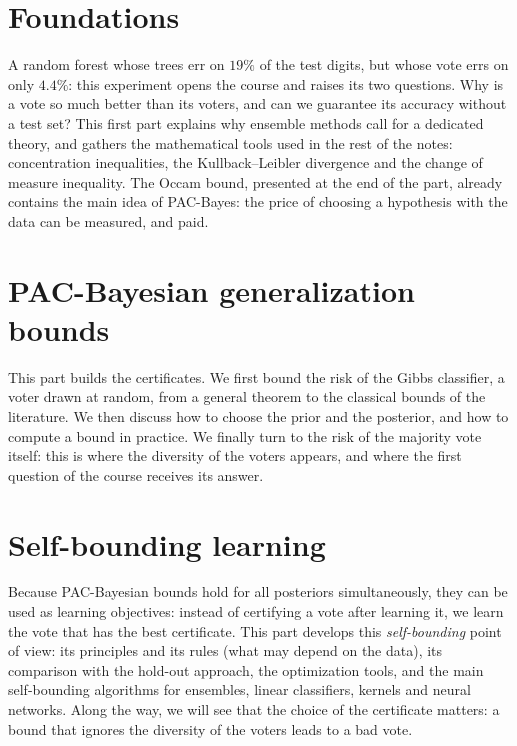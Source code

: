 \documentclass[11pt,a4paper]{article}
\numberwithin{equation}{section}
\begin{document}
\part{Foundations}
A random forest whose trees err on $19\%$ of the test digits, but whose vote
errs on only $4.4\%$: this experiment opens the course and raises its two
questions. Why is a vote so much better than its voters, and can we guarantee its
accuracy without a test set? This first part explains why ensemble methods call
for a dedicated theory, and gathers the mathematical tools used in the rest of
the notes: concentration inequalities, the Kullback--Leibler divergence and the
change of measure inequality. The Occam bound, presented at the end of the part,
already contains the main idea of PAC-Bayes: the price of choosing a hypothesis
with the data can be measured, and paid.
\clearpage




\part{PAC-Bayesian generalization bounds}
This part builds the certificates. We first bound the risk of the Gibbs
classifier, a voter drawn at random, from a general theorem to the classical
bounds of the literature. We then discuss how to choose the prior and the
posterior, and how to compute a bound in practice. We finally turn to the risk of
the majority vote itself: this is where the diversity of the voters appears, and
where the first question of the course receives its answer.
\clearpage





\part{Self-bounding learning}
Because PAC-Bayesian bounds hold for all posteriors simultaneously, they can be
used as learning objectives: instead of certifying a vote after learning it, we
learn the vote that has the best certificate. This part develops this
\emph{self-bounding} point of view: its principles and its rules (what may depend
on the data), its comparison with the hold-out approach, the optimization tools,
and the main self-bounding algorithms for ensembles, linear classifiers, kernels
and neural networks. Along the way, we will see that the choice of the certificate
matters: a bound that ignores the diversity of the voters leads to a bad vote.
\clearpage
\end{document}
